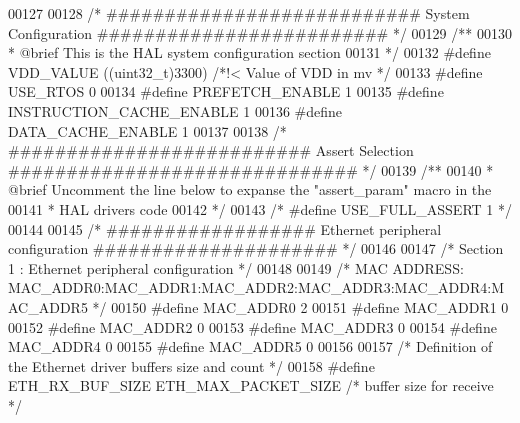 \begin{DoxyCode}
00127 
00128 \textcolor{comment}{/* ########################### System Configuration ######################### */}
00129 \textcolor{comment}{/**}
00130 \textcolor{comment}{  * @brief This is the HAL system configuration section}
00131 \textcolor{comment}{  */}
00132 \textcolor{preprocessor}{#}\textcolor{preprocessor}{define}  \textcolor{preprocessor}{VDD\_VALUE}                    \textcolor{preprocessor}{(}\textcolor{preprocessor}{(}\textcolor{preprocessor}{uint32\_t}\textcolor{preprocessor}{)}3300\textcolor{preprocessor}{)} \textcolor{comment}{/*!< Value of VDD in mv */}
00133 \textcolor{preprocessor}{#}\textcolor{preprocessor}{define}  \textcolor{preprocessor}{USE\_RTOS}                     0
00134 \textcolor{preprocessor}{#}\textcolor{preprocessor}{define}  \textcolor{preprocessor}{PREFETCH\_ENABLE}              1
00135 \textcolor{preprocessor}{#}\textcolor{preprocessor}{define}  \textcolor{preprocessor}{INSTRUCTION\_CACHE\_ENABLE}     1
00136 \textcolor{preprocessor}{#}\textcolor{preprocessor}{define}  \textcolor{preprocessor}{DATA\_CACHE\_ENABLE}            1
00137 
00138 \textcolor{comment}{/* ########################## Assert Selection ############################## */}
00139 \textcolor{comment}{/**}
00140 \textcolor{comment}{  * @brief Uncomment the line below to expanse the "assert\_param" macro in the }
00141 \textcolor{comment}{  *        HAL drivers code}
00142 \textcolor{comment}{  */}
00143 \textcolor{comment}{/* #define USE\_FULL\_ASSERT    1 */}
00144 
00145 \textcolor{comment}{/* ################## Ethernet peripheral configuration ##################### */}
00146 
00147 \textcolor{comment}{/* Section 1 : Ethernet peripheral configuration */}
00148 
00149 \textcolor{comment}{/* MAC ADDRESS: MAC\_ADDR0:MAC\_ADDR1:MAC\_ADDR2:MAC\_ADDR3:MAC\_ADDR4:MAC\_ADDR5 */}
00150 \textcolor{preprocessor}{#}\textcolor{preprocessor}{define} \textcolor{preprocessor}{MAC\_ADDR0}   2
00151 \textcolor{preprocessor}{#}\textcolor{preprocessor}{define} \textcolor{preprocessor}{MAC\_ADDR1}   0
00152 \textcolor{preprocessor}{#}\textcolor{preprocessor}{define} \textcolor{preprocessor}{MAC\_ADDR2}   0
00153 \textcolor{preprocessor}{#}\textcolor{preprocessor}{define} \textcolor{preprocessor}{MAC\_ADDR3}   0
00154 \textcolor{preprocessor}{#}\textcolor{preprocessor}{define} \textcolor{preprocessor}{MAC\_ADDR4}   0
00155 \textcolor{preprocessor}{#}\textcolor{preprocessor}{define} \textcolor{preprocessor}{MAC\_ADDR5}   0
00156 
00157 \textcolor{comment}{/* Definition of the Ethernet driver buffers size and count */}
00158 \textcolor{preprocessor}{#}\textcolor{preprocessor}{define} \textcolor{preprocessor}{ETH\_RX\_BUF\_SIZE}                \textcolor{preprocessor}{ETH\_MAX\_PACKET\_SIZE} \textcolor{comment}{/* buffer size for receive               */}

\end{DoxyCode}
